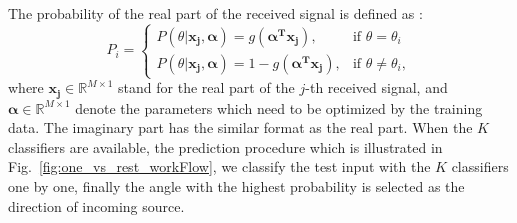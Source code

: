 \documentclass[journal]{IEEEtran}
\begin{document}
The probability of the real part of the received signal is defined as :
\begin{equation} \label{eqt:probability_one_vs_rest}
P_{i} = \left\{\begin{matrix}
P(\theta | \boldsymbol{x_{j},\alpha}) = g(\boldsymbol{\alpha^{T} x_{j}}), &\text{if } \theta = \theta_{i}\\ 
P(\theta | \boldsymbol{x_{j},\alpha}) = 1 -g(\boldsymbol{\alpha^{T} x_{j}}), &\text{if } \theta \neq  \theta_{i}, 
\end{matrix}\right.
\end{equation}
where $\boldsymbol{x_{j}} \in  \mathbb{R}^{M\times 1} $ stand for the real part of the $j$-th received signal, and $\boldsymbol{\alpha} \in  \mathbb{R}^{M\times 1}$ denote the parameters which need to be optimized by the training data.
The imaginary part has the similar format as the real part.   
When the $K$ classifiers are available, the prediction procedure which is illustrated in Fig.~\ref{fig:one_vs_rest_workFlow}, we classify the test input with the $K$ classifiers one by one, finally the angle with the highest probability is selected as the direction of incoming source.  
\end{document}
